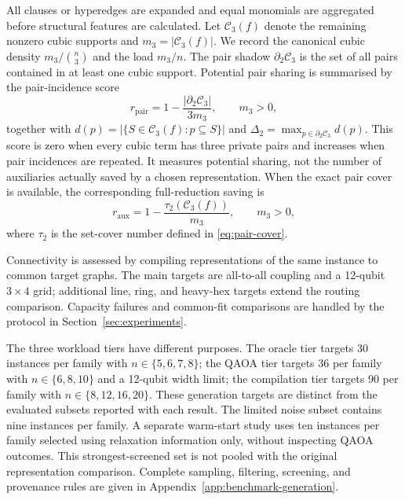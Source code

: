 \documentclass[a4paper,onecolumn,11pt,unpublished]{quantumarticle}
\theoremstyle{remark}
\begin{document}
All clauses or hyperedges are expanded and equal monomials are aggregated
before structural features are calculated.  Let $\mathcal C_3(f)$ denote the
remaining nonzero cubic supports and $m_3=|\mathcal C_3(f)|$.  We record the
canonical cubic density $m_3/\binom{n}{3}$ and the load $m_3/n$.  The pair shadow
$\partial_2\mathcal C_3$ is the set of all pairs contained in at least one
cubic support.  Potential pair sharing is summarised by the pair-incidence
score
\begin{equation}
  r_{\mathrm{pair}}
  =1-\frac{|\partial_2\mathcal C_3|}{3m_3},
  \qquad m_3>0,
  \label{eq:pair-reuse-score}
\end{equation}
together with $d(p)=|\{S\in\mathcal C_3(f):p\subseteq S\}|$ and
$\Delta_2=\max_{p\in\partial_2\mathcal C_3}d(p)$.  This score
is zero when every cubic term has three private pairs and increases when pair
incidences are repeated.  It measures potential sharing, not the number of
auxiliaries actually saved by a chosen representation.  When the exact pair
cover is available, the corresponding full-reduction saving is
\begin{equation}
  r_{\mathrm{aux}}
  =1-\frac{\tau_2(\mathcal C_3(f))}{m_3},
  \qquad m_3>0,
  \label{eq:auxiliary-saving-score}
\end{equation}
where $\tau_2$ is the set-cover number defined in \cref{eq:pair-cover}.

Connectivity is assessed by compiling representations of the same instance to
common target graphs. The main targets are all-to-all coupling and a 12-qubit
$3\times4$ grid; additional line, ring, and heavy-hex targets extend the
routing comparison. Capacity failures and common-fit comparisons are handled
by the protocol in Section~\ref{sec:experiments}.

The three workload tiers have different purposes. The oracle tier targets
30 instances per family with $n\in\{5,6,7,8\}$; the QAOA tier targets 36 per
family with $n\in\{6,8,10\}$ and a 12-qubit width limit; the compilation tier
targets 90 per family with $n\in\{8,12,16,20\}$. These generation targets are
distinct from the evaluated subsets reported with each result. The limited
noise subset contains nine instances per family. A separate warm-start study
uses ten instances per family selected using relaxation information only,
without inspecting QAOA outcomes. This strongest-screened set is not pooled
with the original representation comparison. Complete sampling, filtering,
screening, and provenance rules are given in
Appendix~\ref{app:benchmark-generation}.
\end{document}
